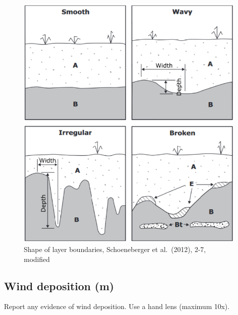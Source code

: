 \documentclass[
  letterpaper,
  DIV=11,
  numbers=noendperiod]{scrreprt}
\begin{document}
\begin{figure}

{\centering \includegraphics{./figure_8-11.png}

}

\caption{Shape of layer boundaries, Schoeneberger et al.~(2012), 2-7,
modified}

\end{figure}

\hypertarget{wind-deposition-m}{%
\subsection{Wind deposition (m)}\label{wind-deposition-m}}

Report any evidence of wind deposition. Use a hand lens (maximum 10x).
\end{document}
